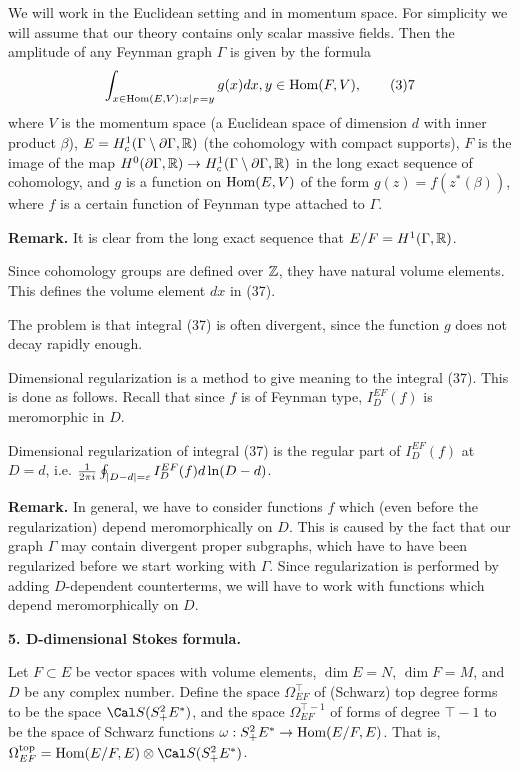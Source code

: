 We will work in the Euclidean setting and in momentum space. 
For simplicity we will assume that our theory contains only  
scalar massive fields. 
Then the amplitude of any Feynman graph $\Gamma$ 
is given by the formula
$$
\int_{x\in\Hom(E,V):x|_F=y}g(x)dx, y\in \Hom(F,V),\tag 37
$$
where $V$ is the momentum space 
(a Euclidean space
of dimension $d$ with inner product $\beta$),
$E=H^1_c(\Gamma\setminus\partial\Gamma,\Bbb R)$
(the cohomology with compact supports), 
$F$ is the image of the map $H^0(\partial\Gamma,\Bbb R)\to
H^1_c(\Gamma\setminus\partial\Gamma,\Bbb R)$ in the long exact sequence
of cohomology, and 
$g$ is a function on $\text{Hom}(E,V)$ of the form
$g(z)=f(z^*(\beta))$, 
where $f$ is a certain function of Feynman type
attached to $\Gamma$.

{\bf Remark.} It is clear 
from the long exact sequence
that $E/F=H^1(\Gamma,\Bbb R)$. 

Since cohomology groups are defined over $\Bbb Z$, they have
natural volume elements. This defines the volume element
$dx$ in (37). 

The problem is that integral (37) is often divergent, since the function
$g$ does not decay rapidly enough. 

Dimensional regularization is a method to give meaning to the integral (37).
This is done as follows. 
Recall that since $f$ is of Feynman type, 
$I_D^{EF}(f)$ is meromorphic in $D$.

 Dimensional regularization 
of integral (37) is the regular part of
$I_D^{EF}(f)$ at $D=d$, i.e. 
$\frac{1}{2\pi i}\oint_{|D-d|=\varepsilon}I_D^{EF}(f)d\ln(D-d)$.  
\endproclaim

{\bf Remark.} In general, we have to consider functions 
$f$ which (even before the regularization) depend meromorphically on $D$. 
This is caused by the fact that our graph $\Gamma$ may contain divergent
proper subgraphs, which have to have been regularized 
before we start working with $\Gamma$. Since regularization
is performed by adding $D$-dependent counterterms, we will have to work
with functions which depend meromorphically on $D$. 
 
{\bf 5. D-dimensional Stokes formula.}

Let $F\subset E$ be vector spaces
with volume elements, $\dim E=N$, $\dim F=M$, and
$D$ be any complex number.
Define the space $\Omega_{EF}^{\top}$ 
of (Schwarz) top degree forms  
to be the space $\Cal S(S^2_+E^*)$, and the space 
$\Omega_{EF}^{\top-1}$ of forms of degree $\top-1$ to be the space
of Schwarz functions 
$\omega: S^2_+E^*\to \text{Hom}(E/F,E)$. That is,
$\Omega_{EF}^{\top}=\Hom(E/F,E)\o \Cal S(S^2_+E^*)$. 

